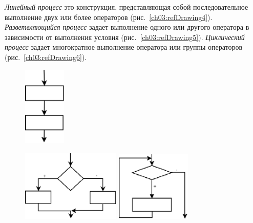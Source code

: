 \emph{Линейный процесс} это конструкция, представляющая собой последовательное
выполнение двух или более операторов (рис.~\ref{ch03:refDrawing4}).
\emph{Разветвляющийся процесс} задает выполнение одного или другого
оператора в зависимости от выполнения условия (рис.~\ref{ch03:refDrawing5}).
\emph{Циклический процесс} задает многократное выполнение оператора или группы
операторов (рис.~\ref{ch03:refDrawing6}).

{\footnotesize
   \begin{figure}%
   \begin{floatrow}[3]
   \captionnamefont{\footnotesize}
   {\includegraphics[width=0.18\textwidth,keepaspectratio]{img/ris_3_5}}%

   {\includegraphics[width=0.42\textwidth,keepaspectratio]{img/ris_3_6}}%
   {\includegraphics[width=0.32\textwidth,keepaspectratio]{img/ris_3_7}}%
   \end{floatrow}
   \end{figure}%
}

